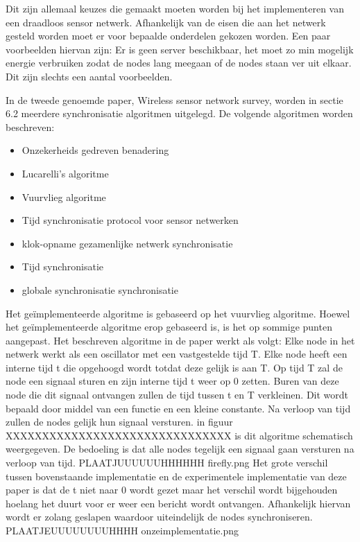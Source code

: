 \documentclass{article}
\begin{document}
Dit zijn allemaal keuzes die gemaakt moeten worden bij het implementeren van een draadloos sensor netwerk. Afhankelijk van de eisen die aan het netwerk gesteld worden moet er voor bepaalde onderdelen gekozen worden. Een paar voorbeelden hiervan zijn: Er is geen server beschikbaar, het moet zo min mogelijk energie verbruiken zodat de nodes lang meegaan of de nodes staan ver uit elkaar. Dit zijn slechts een aantal voorbeelden. 

In de tweede genoemde paper, Wireless sensor network survey, worden in sectie 6.2 meerdere synchronisatie algoritmen uitgelegd. De volgende algoritmen worden beschreven:
\begin{itemize}
	\item Onzekerheids gedreven benadering
	\item Lucarelli's algoritme
	\item Vuurvlieg algoritme
	\item Tijd synchronisatie protocol voor sensor netwerken
	\item klok-opname gezamenlijke netwerk synchronisatie
	\item Tijd synchronisatie
	\item globale synchronisatie
	synchronisatie 
\end{itemize}

Het ge\"{i}mplementeerde algoritme is gebaseerd op het vuurvlieg algoritme. Hoewel het ge\"{i}mplementeerde algoritme erop gebaseerd is, is het op sommige punten aangepast. 
Het beschreven algoritme in de paper werkt als volgt: 
Elke node in het netwerk werkt als een oscillator met een vastgestelde tijd T. Elke node heeft een interne tijd t die opgehoogd wordt totdat deze gelijk is aan T. Op tijd T zal de node een signaal sturen en zijn interne tijd t weer op 0 zetten. Buren van deze node die dit signaal ontvangen zullen de tijd tussen t en T verkleinen. Dit wordt bepaald door middel van een functie en een kleine constante. Na verloop van tijd zullen de nodes gelijk hun signaal versturen. in figuur XXXXXXXXXXXXXXXXXXXXXXXXXXXXXXX is dit algoritme schematisch weergegeven. De bedoeling is dat alle nodes tegelijk een signaal gaan versturen na verloop van tijd.  PLAATJUUUUUUHHHHHH firefly.png
Het grote verschil tussen bovenstaande implementatie en de experimentele implementatie van deze paper is dat de t niet naar 0 wordt gezet maar het verschil wordt bijgehouden hoelang het duurt voor er weer een bericht wordt ontvangen. Afhankelijk hiervan wordt er zolang geslapen waardoor uiteindelijk de nodes synchroniseren. PLAATJEUUUUUUUUHHHH onzeimplementatie.png
\end{document}
